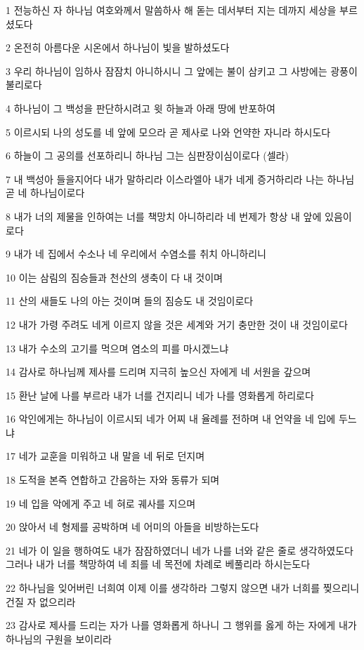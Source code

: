 \par 1 전능하신 자 하나님 여호와께서 말씀하사 해 돋는 데서부터 지는 데까지 세상을 부르셨도다
\par 2 온전히 아름다운 시온에서 하나님이 빛을 발하셨도다
\par 3 우리 하나님이 임하사 잠잠치 아니하시니 그 앞에는 불이 삼키고 그 사방에는 광풍이 불리로다
\par 4 하나님이 그 백성을 판단하시려고 윗 하늘과 아래 땅에 반포하여
\par 5 이르시되 나의 성도를 네 앞에 모으라 곧 제사로 나와 언약한 자니라 하시도다
\par 6 하늘이 그 공의를 선포하리니 하나님 그는 심판장이심이로다 (셀라)
\par 7 내 백성아 들을지어다 내가 말하리라 이스라엘아 내가 네게 증거하리라 나는 하나님 곧 네 하나님이로다
\par 8 내가 너의 제물을 인하여는 너를 책망치 아니하리라 네 번제가 항상 내 앞에 있음이로다
\par 9 내가 네 집에서 수소나 네 우리에서 수염소를 취치 아니하리니
\par 10 이는 삼림의 짐승들과 천산의 생축이 다 내 것이며
\par 11 산의 새들도 나의 아는 것이며 들의 짐승도 내 것임이로다
\par 12 내가 가령 주려도 네게 이르지 않을 것은 세계와 거기 충만한 것이 내 것임이로다
\par 13 내가 수소의 고기를 먹으며 염소의 피를 마시겠느냐
\par 14 감사로 하나님께 제사를 드리며 지극히 높으신 자에게 네 서원을 갚으며
\par 15 환난 날에 나를 부르라 내가 너를 건지리니 네가 나를 영화롭게 하리로다
\par 16 악인에게는 하나님이 이르시되 네가 어찌 내 율례를 전하며 내 언약을 네 입에 두느냐
\par 17 네가 교훈을 미워하고 내 말을 네 뒤로 던지며
\par 18 도적을 본즉 연합하고 간음하는 자와 동류가 되며
\par 19 네 입을 악에게 주고 네 혀로 궤사를 지으며
\par 20 앉아서 네 형제를 공박하며 네 어미의 아들을 비방하는도다
\par 21 네가 이 일을 행하여도 내가 잠잠하였더니 네가 나를 너와 같은 줄로 생각하였도다 그러나 내가 너를 책망하여 네 죄를 네 목전에 차례로 베풀리라 하시는도다
\par 22 하나님을 잊어버린 너희여 이제 이를 생각하라 그렇지 않으면 내가 너희를 찢으리니 건질 자 없으리라
\par 23 감사로 제사를 드리는 자가 나를 영화롭게 하나니 그 행위를 옳게 하는 자에게 내가 하나님의 구원을 보이리라

